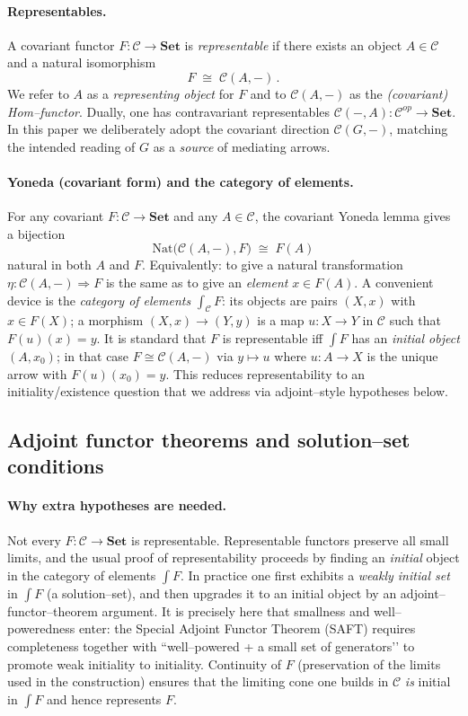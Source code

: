 \documentclass[11pt]{article}
\theoremstyle{upright}
\begin{document}
\paragraph{Representables.}
A covariant functor \(F:\mathcal C\to\mathbf{Set}\) is \emph{representable} if there exists an object \(A\in\mathcal C\) and a natural isomorphism
\[
F \;\cong\; \mathcal C(A,-)\,.
\]
We refer to \(A\) as a \emph{representing object} for \(F\) and to \(\mathcal C(A,-)\) as the \emph{(covariant) Hom–functor}. Dually, one has contravariant representables \(\mathcal C(-,A):\mathcal C^{op}\to\mathbf{Set}\). In this paper we deliberately adopt the covariant direction \(\mathcal C(G,-)\), matching the intended reading of \(G\) as a \emph{source} of mediating arrows.

\paragraph{Yoneda (covariant form) and the category of elements.}
For any covariant \(F:\mathcal C\to\mathbf{Set}\) and any \(A\in\mathcal C\), the covariant Yoneda lemma gives a bijection
\[
\mathrm{Nat}\big(\mathcal C(A,-),F\big)\;\cong\;F(A)
\]
natural in both \(A\) and \(F\). Equivalently: to give a natural transformation \(\eta:\mathcal C(A,-)\Rightarrow F\) is the same as to give an \emph{element} \(x\in F(A)\).
A convenient device is the \emph{category of elements} \(\int_{\mathcal C}\! F\): its objects are pairs \((X,x)\) with \(x\in F(X)\); a morphism \((X,x)\to(Y,y)\) is a map \(u:X\to Y\) in \(\mathcal C\) such that \(F(u)(x)=y\).
It is standard that \(F\) is representable iff \(\int F\) has an \emph{initial object} \((A,x_0)\); in that case \(F\cong\mathcal C(A,-)\) via \(y\mapsto u\) where \(u:A\to X\) is the unique arrow with \(F(u)(x_0)=y\). \citep{MacLane1998}
This reduces representability to an initiality/existence question that we address via adjoint–style hypotheses below.

\subsection{Adjoint functor theorems and solution–set conditions}
\paragraph{Why extra hypotheses are needed.}
Not every $F:\mathcal C\to\mathbf{Set}$ is representable. Representable functors preserve all small limits, and the usual proof of representability proceeds by finding an \emph{initial} object in the category of elements $\int F$. In practice one first exhibits a \emph{weakly initial set} in $\int F$ (a solution–set), and then upgrades it to an initial object by an adjoint–functor–theorem argument. It is precisely here that smallness and well–poweredness enter: the Special Adjoint Functor Theorem (SAFT) requires completeness together with “well–powered + a small set of generators’’ to promote weak initiality to initiality. Continuity of $F$ (preservation of the limits used in the construction) ensures that the limiting cone one builds in $\mathcal C$ \emph{is} initial in $\int F$ and hence represents $F$.\citep{Freyd1964Abelian,MacLane1998}
\end{document}
